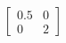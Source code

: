 \documentclass[preview]{standalone}
\begin{document}
\begin{align*}
\begin{bmatrix} 0.5 & 0 \\ 0 & 2 \end{bmatrix}
\end{align*}
\end{document}
